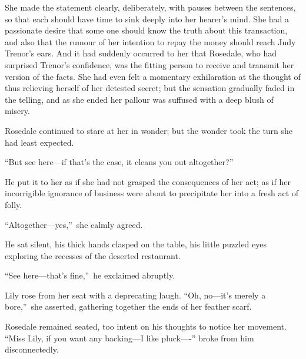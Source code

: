 \documentclass[12pt,a4paper]{book}
\begin{document}
She made the statement clearly, deliberately, with pauses between
the sentences, so that each should have time to sink deeply into
her hearer's mind. She had a passionate desire that some one
should know the truth about this transaction, and also that the
rumour of her intention to repay the money should reach Judy
Trenor's ears. And it had suddenly occurred to her that Rosedale,
who had surprised Trenor's confidence, was the fitting person to
receive and transmit her version of the facts. She had even felt
a momentary exhilaration at the thought of thus relieving herself
of her detested secret; but the sensation gradually faded in the
telling, and as she ended her pallour was suffused with a deep
blush of misery.





Rosedale continued to stare at her in wonder; but the wonder took
the turn she had least expected.





``But see here---if that's the case, it cleans you out altogether?''





He put it to her as if she had not grasped the consequences of
her act; as if her incorrigible ignorance of business were about
to precipitate her into a fresh act of folly.





``Altogether---yes,''\ she calmly agreed.





He sat silent, his thick hands clasped on the table, his little
puzzled eyes exploring the recesses of the deserted restaurant.





``See here---that's fine,''\ he exclaimed abruptly.





Lily rose from her seat with a deprecating laugh. ``Oh, no---it's
merely a bore,''\ she asserted, gathering together the ends of her
feather scarf.





Rosedale remained seated, too intent on his thoughts to notice
her movement. ``Miss Lily, if you want any backing---I like pluck----''
broke from him disconnectedly.
\end{document}
